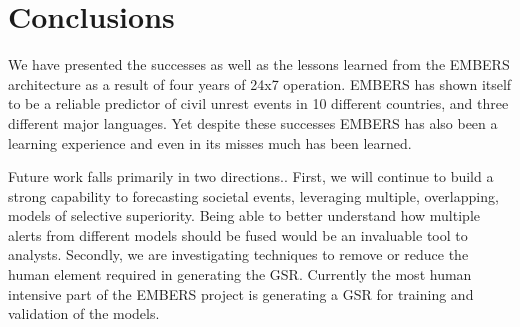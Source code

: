 \documentclass[11pt,a4paper,extrafontsizes,oneside]{article}
\begin{document}
\section{Conclusions}
We have presented the successes as well as the lessons learned from the EMBERS
architecture as a result of four years of 24x7 operation.  EMBERS has shown
itself to be a reliable predictor of civil unrest events in 10 different
countries, and three different major languages.  Yet despite these successes
EMBERS has also been a learning experience and even in its misses much has been
learned.

Future work falls primarily in two directions..
First, we will continue
to build a strong capability to forecasting societal events,
leveraging multiple, overlapping,
models of selective superiority.
Being able to better understand how multiple
alerts from different models should be fused would 
be an invaluable tool to analysts.
Secondly, we are investigating
techniques to remove or reduce the human element required in generating 
the GSR.  Currently the most human intensive part of the EMBERS project 
is generating a GSR for training and validation of the models.
\end{document}
